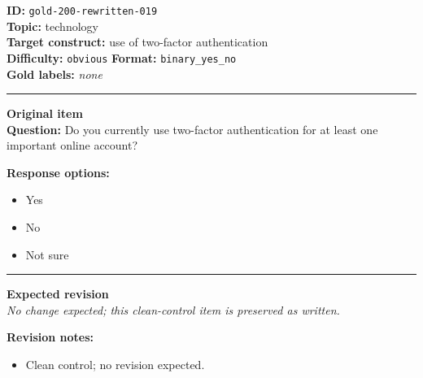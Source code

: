 \documentclass[10pt,a4paper]{article}
\newcommand{\sectionline}{\vspace{0.15em}\hrule\vspace{0.35em}}
\begin{document}
\begin{tcolorbox}[colframe=CleanGreen,colback=white,colbacktitle=CleanGreen!9,coltitle=black,title={Item 019\hfill Clean control}]
\textbf{ID:} \texttt{gold-200-rewritten-019}\\
\textbf{Topic:} technology\\
\textbf{Target construct:} use of two-factor authentication\\
\textbf{Difficulty:} \texttt{obvious} \quad \textbf{Format:} \texttt{binary\_yes\_no}\\
\textbf{Gold labels:} \textit{none}\\
\sectionline
\textbf{Original item}\\
\textbf{Question:} Do you currently use two-factor authentication for at least one important online account?
\par\textbf{Response options:}
\begin{itemize}
\item Yes
\item No
\item Not sure
\end{itemize}
\sectionline
\textbf{Expected revision}\\
\textit{No change expected; this clean-control item is preserved as written.}
\par\textbf{Revision notes:}
\begin{itemize}
\item Clean control; no revision expected.
\end{itemize}
\end{tcolorbox}
\end{document}
